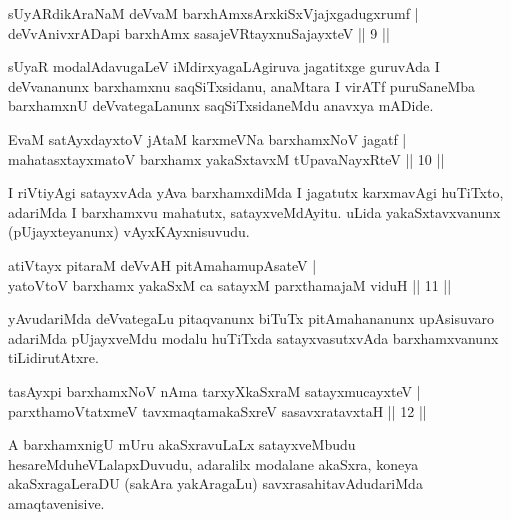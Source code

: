 \begin{shl}
sUyARdikAraNaM deVvaM barxhAmx\s sArxkiSxVjajxgadugxrumf | \\
deVvAnivxrADapi barxhAmx sasajeVRtayxnuSajayxteV \hfill ||  9 || 
\end{shl}

\begin{artha}
sUyaR modalAdavugaLeV iMdirxyagaLAgiruva jagatitxge guruvAda I deVvananunx barxhamxnu saqSiTxsidanu, anaMtara I virATf puruSaneMba barxhamxnU deVvategaLanunx saqSiTxsidaneMdu anavxya mADide.
\end{artha}

\begin{shl}
EvaM satAyxdayxtoV jAtaM karxmeVNa barxhamxNoV jagatf | \\
mahatasxtayxmatoV barxhamx yakaSxtavxM tUpavaNayxRteV \hfill ||  10 || 
\end{shl}

\begin{artha}
I riVtiyAgi satayxvAda yAva barxhamxdiMda I jagatutx karxmavAgi huTiTxto, adariMda I barxhamxvu mahatutx, satayxveMdAyitu. uLida yakaSxtavxvanunx (pUjayxteyanunx) vAyxKAyxnisuvudu.
\end{artha}

\begin{shl}
atiVtayx pitaraM deVvAH pitAmahamupAsateV | \\
yatoV\s toV barxhamx yakaSxM ca satayxM parxthamajaM viduH \hfill ||  11 || 
\end{shl}

\begin{artha}
yAvudariMda deVvategaLu pitaqvanunx biTuTx pitAmahananunx upAsisuvaro adariMda pUjayxveMdu modalu huTiTxda satayxvasutxvAda barxhamxvanunx tiLidirutAtxre.
\end{artha}


\begin{shl}
tasAyxpi barxhamxNoV nAma tarxyXkaSxraM satayxmucayxteV | \\
parxthamoVtatxmeV tavxmaqtamakaSxreV sasavxratavxtaH \hfill ||  12 || 
\end{shl}

\begin{artha}
A barxhamxnigU mUru akaSxravuLaLx satayxveMbudu hesareMdu\break heVLalapxDuvudu, adaralilx modalane akaSxra, koneya akaSxragaLeraDU (sakAra yakAragaLu) savxrasahitavAdudariMda amaqtavenisive.
\end{artha}

